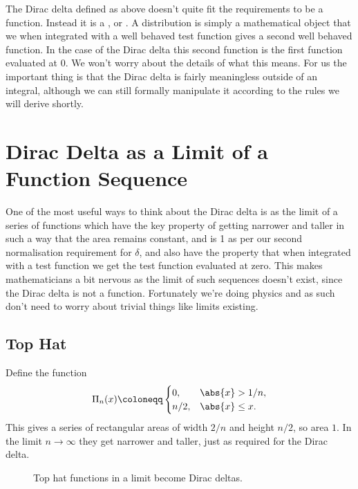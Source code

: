\documentclass[fleqn]{NotesClass}
\begin{document}
    The Dirac delta defined as above doesn't quite fit the requirements to be a function.
    Instead it is a , or .
    A distribution is simply a mathematical object that we when integrated with a well behaved test function gives a second well behaved function.
    In the case of the Dirac delta this second function is the first function evaluated at 0.
    We won't worry about the details of what this means.
    For us the important thing is that the Dirac delta is fairly meaningless outside of an integral, although we can still formally manipulate it according to the rules we will derive shortly.
    
    \section{Dirac Delta as a Limit of a Function Sequence}
    One of the most useful ways to think about the Dirac delta is as the limit of a series of functions which have the key property of getting narrower and taller in such a way that the area remains constant, and is 1 as per our second normalisation requirement for \(\delta\), and also have the property that when integrated with a test function we get the test function evaluated at zero.
    This makes mathematicians a bit nervous as the limit of such sequences doesn't exist, since the Dirac delta is not a function.
    Fortunately we're doing physics and as such don't need to worry about trivial things like limits existing.
    
    \subsection{Top Hat}
    Define the  function
    \begin{equation}
        \Pi_n(x) \coloneqq
        \begin{cases}
            0, & \abs{x} > 1/n,\\
            n/2, & \abs{x} \le x.
        \end{cases}
    \end{equation}
    This gives a series of rectangular areas of width \(2/n\) and height \(n/2\), so area \(1\).
    In the limit \(n \to \infty\) they get narrower and taller, just as required for the Dirac delta.
    
    \begin{figure}
        \caption{Top hat functions in a limit become Dirac deltas.}
    \end{figure}
    
\end{document}
